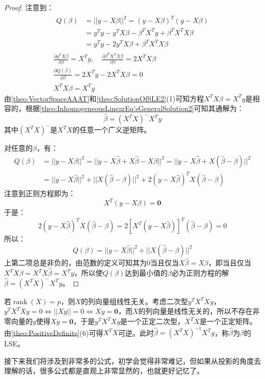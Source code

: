 \begin{proof}
	注意到：
	\begin{gather*}
		\begin{aligned}
			Q(\beta)&=||y-X\beta||^2=(y-X\beta)^T(y-X\beta) \\
			&=y^Ty-y^TX\beta-\beta^TX^Ty+\beta^TX^TX\beta \\
			&=y^Ty-2y^TX\beta+\beta^TX^TX\beta
		\end{aligned}\\
		\frac{\partial y^TX\beta}{\partial\beta}=X^Ty,\quad
		\frac{\partial \beta^TX^TX\beta}{\partial\beta}=2X^TX\beta \\
		\frac{\partial Q(\beta)}{\partial\beta}=2X^Ty-2X^TX\beta=0 \\
		X^TX\beta=X^Ty
	\end{gather*}
	由\cref{theo:VectorSpaceAAAT}和\cref{theo:SolutionOfSLE2}(1)可知方程$X^TX\beta=X^Ty$是相容的，根据\cref{theo:InhomogeneousLinearEq'sGeneralSolution2}可知其通解为：
	\begin{equation*}
		\hat{\beta}=(X^TX)^-X^Ty
	\end{equation*}
	其中$(X^TX)^-$是$X^TX$的任意一个广义逆矩阵。\par
	对任意的$\beta$，有：
	\begin{align*}
		Q(\beta)&=||y-X\beta||^2=||y-X\hat{\beta}+X\hat{\beta}-X\beta||^2=||y-X\hat{\beta}+X(\hat{\beta}-\beta)||^2 \\
		&=||y-X\hat{\beta}||^2+||X(\hat{\beta}-\beta)||^2+2(y-X\hat{\beta})^TX(\hat{\beta}-\beta)
	\end{align*}
	注意到正则方程即为：
	\begin{equation*}
		X^T(y-X\beta)=\mathbf{0}
	\end{equation*}
	于是：
	\begin{equation*}
		2(y-X\hat{\beta})^TX(\hat{\beta}-\beta)=2[X^T(y-X\hat{\beta})]^T(\hat{\beta}-\beta)=0
	\end{equation*}
	所以：
	\begin{equation*}
		Q(\beta)=||y-X\hat{\beta}||^2+||X(\hat{\beta}-\beta)||^2
	\end{equation*}
	上第二项总是非负的，由范数的定义可知其为$0$当且仅当$X\hat{\beta}=X\beta$，即当且仅当$X^TX\beta=X^TX\hat{\beta}=X^Ty$，所以使$Q(\beta)$达到最小值的$\beta$必为正则方程的解$\hat{\beta}=(X^TX)^-X^Ty$。
\end{proof}
\begin{derivation}
	若$\operatorname{rank}(X)=p$，则$X$的列向量组线性无关。考虑二次型$y^TX^TXy$，$y^TX^TXy=0\Leftrightarrow||Xy||=0\Leftrightarrow Xy=\mathbf{0}$，而$X$的列向量是线性无关的，所以不存在非零向量的$y$使得$Xy=\mathbf{0}$，于是$y^TX^TXy$是一个正定二次型，$X^TX$是一个正定矩阵。由\cref{theo:PositiveDefinite}(6)可得$X^TX$可逆。此时$\hat{\beta}=(X^TX)^{-1}X^Ty$，称$\hat{\beta}$为$\beta$的\gls{LSE}。
\end{derivation}
\begin{note}
	接下来我们将涉及到非常多的公式，初学会觉得非常难记，但如果从投影的角度去理解的话，很多公式都是直观上非常显然的，也就更好记忆了。
\end{note}
